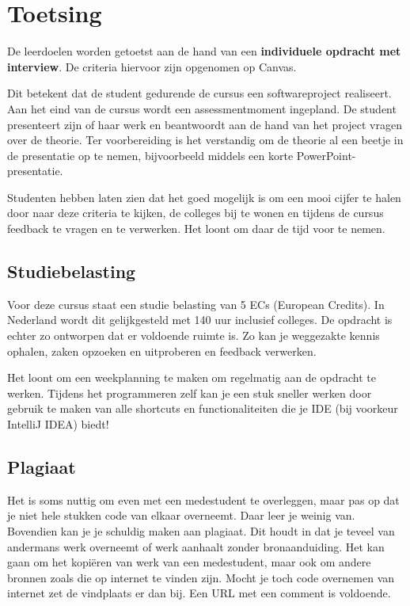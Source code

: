 \section{Toetsing}
De leerdoelen worden getoetst aan de hand van een \textbf{individuele opdracht met interview}.
De criteria hiervoor zijn opgenomen op Canvas. 

Dit betekent dat de student gedurende de cursus een softwareproject realiseert.
Aan het eind van de cursus wordt een assessmentmoment ingepland. De student
presenteert zijn of haar werk en beantwoordt aan de hand van het project
vragen over de theorie. Ter voorbereiding is het verstandig om de theorie al 
een beetje in de presentatie op te nemen, 
bijvoorbeeld middels een korte PowerPoint-presentatie.

Studenten hebben laten zien dat het goed mogelijk is om een mooi cijfer te halen 
door naar deze criteria te kijken, de colleges bij te wonen en tijdens de cursus 
feedback te vragen en te verwerken. Het loont om daar de tijd voor te nemen.

\subsection{Studiebelasting}
Voor deze cursus staat een studie belasting van 5 ECs (European Credits). 
In Nederland wordt dit gelijkgesteld met 140 uur inclusief colleges.
De opdracht is echter zo ontworpen dat er voldoende ruimte is.
Zo kan je weggezakte kennis ophalen, zaken opzoeken en uitproberen
en feedback verwerken.

Het loont om een weekplanning te maken om regelmatig aan de opdracht 
te werken. Tijdens het programmeren zelf kan je een stuk sneller werken door 
gebruik te maken van alle shortcuts en functionaliteiten die je 
IDE (bij voorkeur IntelliJ IDEA) biedt!

\subsection{Plagiaat}
Het is soms nuttig om even met een medestudent te overleggen,
maar pas op dat je niet hele stukken code van elkaar overneemt.
Daar leer je weinig van. Bovendien kan je je schuldig maken aan 
plagiaat. Dit houdt in dat je teveel van andermans werk overneemt 
of werk aanhaalt zonder bronaanduiding. Het kan gaan om het kopiëren 
van werk van een medestudent, maar ook om andere bronnen zoals die op 
internet te vinden zijn. Mocht je toch code overnemen van internet 
zet de vindplaats er dan bij. Een URL met een comment is voldoende.

